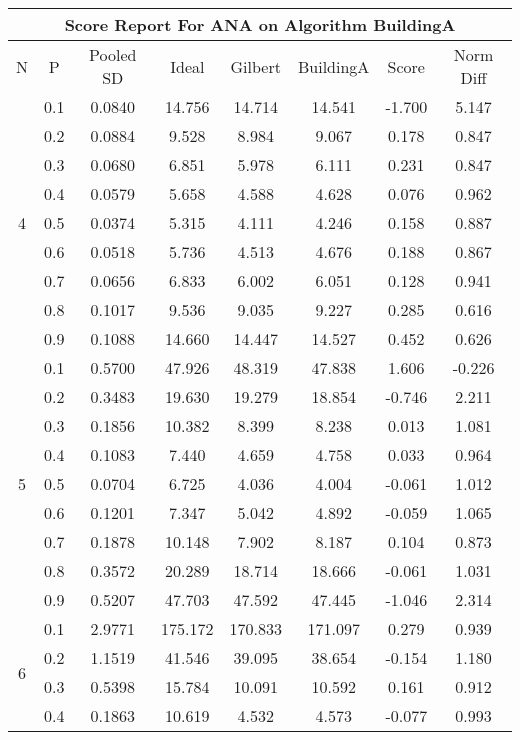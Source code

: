 \documentclass[11pt,a4paper]{report}
\begin{document}
\begin{longtable}{ | c | c || c | c | c | c | c | c | }
\hline
\multicolumn{8}{|c|}{ Score Report For ANA on Algorithm BuildingA} \\
\hline
N & P & Pooled SD &  Ideal &  Gilbert & BuildingA  & Score & Norm Diff \\
 \hline
 \hline
 \endhead
\multirow{9}{*}{4} & 0.1 & 0.0840 & 14.756 & 14.714 & 14.541 & -1.700 & 5.147 \\
 & 0.2 & 0.0884 & 9.528 & 8.984 & 9.067 & 0.178 & 0.847 \\
 & 0.3 & 0.0680 & 6.851 & 5.978 & 6.111 & 0.231 & 0.847 \\
 & 0.4 & 0.0579 & 5.658 & 4.588 & 4.628 & 0.076 & 0.962 \\
 & 0.5 & 0.0374 & 5.315 & 4.111 & 4.246 & 0.158 & 0.887 \\
 & 0.6 & 0.0518 & 5.736 & 4.513 & 4.676 & 0.188 & 0.867 \\
 & 0.7 & 0.0656 & 6.833 & 6.002 & 6.051 & 0.128 & 0.941 \\
 & 0.8 & 0.1017 & 9.536 & 9.035 & 9.227 & 0.285 & 0.616 \\
 & 0.9 & 0.1088 & 14.660 & 14.447 & 14.527 & 0.452 & 0.626 \\
 \hline
\multirow{9}{*}{5} & 0.1 & 0.5700 & 47.926 & 48.319 & 47.838 & 1.606 & -0.226 \\
 & 0.2 & 0.3483 & 19.630 & 19.279 & 18.854 & -0.746 & 2.211 \\
 & 0.3 & 0.1856 & 10.382 & 8.399 & 8.238 & 0.013 & 1.081 \\
 & 0.4 & 0.1083 & 7.440 & 4.659 & 4.758 & 0.033 & 0.964 \\
 & 0.5 & 0.0704 & 6.725 & 4.036 & 4.004 & -0.061 & 1.012 \\
 & 0.6 & 0.1201 & 7.347 & 5.042 & 4.892 & -0.059 & 1.065 \\
 & 0.7 & 0.1878 & 10.148 & 7.902 & 8.187 & 0.104 & 0.873 \\
 & 0.8 & 0.3572 & 20.289 & 18.714 & 18.666 & -0.061 & 1.031 \\
 & 0.9 & 0.5207 & 47.703 & 47.592 & 47.445 & -1.046 & 2.314 \\
 \hline
\multirow{9}{*}{6} & 0.1 & 2.9771 & 175.172 & 170.833 & 171.097 & 0.279 & 0.939 \\
 & 0.2 & 1.1519 & 41.546 & 39.095 & 38.654 & -0.154 & 1.180 \\
 & 0.3 & 0.5398 & 15.784 & 10.091 & 10.592 & 0.161 & 0.912 \\
 & 0.4 & 0.1863 & 10.619 & 4.532 & 4.573 & -0.077 & 0.993 \\

\end{longtable}
\end{document}
